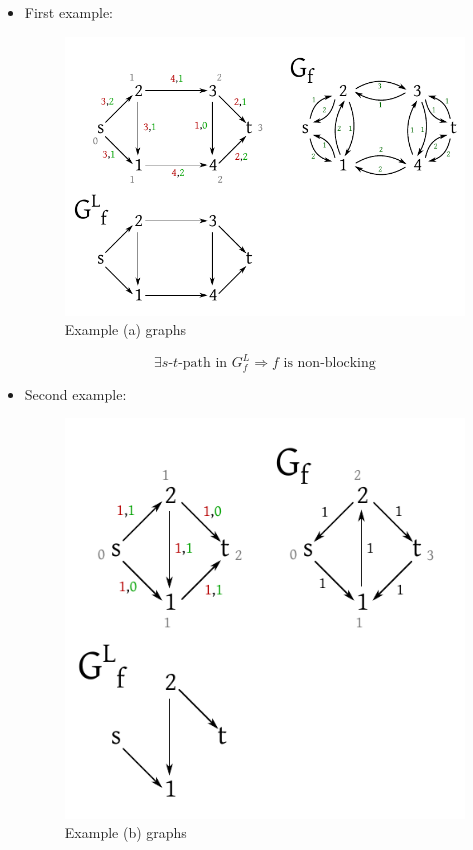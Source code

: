 \documentclass{article}
\newcommand{\gath}[2]{$#1$-$#2$-path} %
\begin{document}
\begin{itemize}
  \item First example:
    \begin{figure}[!ht]
      \begin{center}
       \includegraphics{img/blocking_flows_a.pdf}
       \caption{Example (a) graphs}
      \end{center}
    \end{figure}

    \[
      \exists \text{\gath st in }  G^L_f
        \Rightarrow f \text{ is non-blocking}
    \]

  \item Second example:
    \begin{figure}[!ht]
      \begin{center}
       \includegraphics{img/blocking_flows_b.pdf}
       \caption{Example (b) graphs}
      \end{center}
    \end{figure}


\end{itemize}
\end{document}
